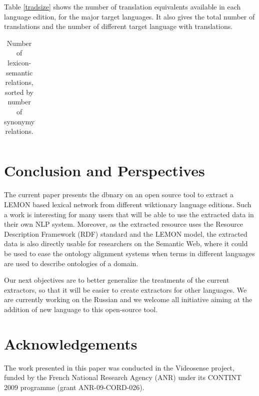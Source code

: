 \documentclass[sw]{iosart2c}
\begin{document}
Table \ref{tradsize} shows the number of translation equivalents available in each language edition, for the major target languages. It also gives the total number of translations and the number of different target language with translations.

\begin{table}[htb]
\begin{tabular}{lrrrrrr}

\end{tabular}
\caption{Number of lexicon-semantic relations, sorted by number of synonymy relations.}\label{nymsize}
\end{table}

\section{Conclusion and Perspectives}

The current paper presents the dbnary  on an open source tool to extract a LEMON based lexical network from different wiktionary language editions. Such a work is interesting for many users that will be able to use the extracted data in their own NLP system. Moreover, as the extracted resource uses the Resource Description Framework (RDF) standard and the LEMON model, the extracted data is also directly usable for researchers on the Semantic Web, where it could be used to ease the ontology alignment systems when terms in different languages are used to describe ontologies of a domain.

Our next objectives are to better generalize the treatments of the current extractors, so that it will be easier to create extractors for other languages. We are currently working on the Russian and we welcome all initiative aiming at the addition of new language to this open-source tool.

\section{Acknowledgements}

The work presented in this paper was conducted in the Videosense project, funded by the French National Research Agency (ANR) under its CONTINT 2009 programme (grant ANR-09-CORD-026).
\end{document}
